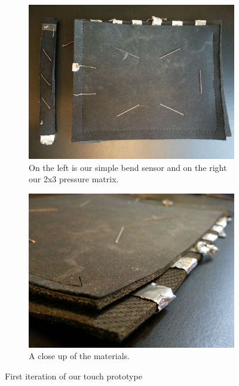 \begin{figure}[h]
\centering
\begin{subfigure}[t]{.5\textwidth}
  \centering
  \includegraphics[width=.9\linewidth]{figures/touch/proto1_1}
  \caption{On the left is our simple bend sensor and on the right our 2x3 pressure matrix.}
\end{subfigure}%
\begin{subfigure}[t]{.5\textwidth}
  \centering
  \includegraphics[width=.9\linewidth]{figures/touch/proto1_2}
  \caption{A close up of the materials.}
\end{subfigure}
\caption{First iteration of our touch prototype}
\label{prototype_1}
\end{figure}

